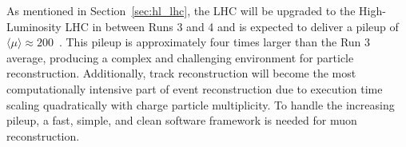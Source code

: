 As mentioned in Section~\ref{sec:hl_lhc}, the LHC will be upgraded to the High-Luminosity LHC in between Runs 3 and 4 and is expected to deliver a pileup of $\langle \mu \rangle \approx 200$~\cite{Schmidt:2016jra}. This pileup is approximately four times larger than the Run 3 average, producing a complex and challenging environment for particle reconstruction. Additionally, track reconstruction will become the most computationally intensive part of event reconstruction due to execution time scaling quadratically with charge particle multiplicity. To handle the increasing pileup, a fast, simple, and clean software framework is needed for muon reconstruction. 